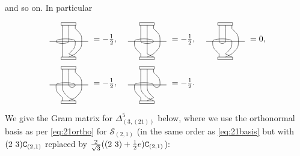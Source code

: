 \documentclass{article}
\newcommand{\ppm}[1]{\textcolor{red}{#1}}
\newcommand{\bajm}[1]{\textcolor{blue}{#1}}
\theoremstyle{definition}
\newcommand{\ignore}[1]{}
\newcommand{\onecuppppp}[6]{ %
\begin{tikzpicture}[scale=0.268]
     \draw (0,0) -- (#1,0) ;        %
     \draw (#4,0) .. controls (#4,-1) .. (2,-2);  %
     \draw (#5,0) .. controls (#5,-1) .. (3,-2);  %
     \draw (#6,0) .. controls (#6,-1) .. (4,-2);  %
\draw (2,-2) -- (2,-2.5) ; %
\draw (3,-2) -- (3,-2.5) ; %
\draw (4,-2) -- (4,-2.5) ; %
\draw (1.79,-2.5) -- (4.1,-2.5) -- (4.1,-2.92) -- (1.79,-2.92) -- (1.79,-2.5);   %
     \draw (#2,0) .. controls (#2,-.5) and (#3,-.5) .. (#3,0) ;    %
 \end{tikzpicture}
 }
\newcommand{\onecupppppx}[6]{ %
\begin{tikzpicture}[scale=0.268]
     \draw (0,0) -- (#1,0) ;        %
     \draw (#4,0) .. controls (#4,-1) .. (2,-2);  %
     \draw (#5,0) .. controls (#5,-1) .. (3,-2);  %
     \draw (#6,0) .. controls (#6,-1) .. (4,-2);  %
\draw (2,-2) -- (2,-2.5) ; %
\draw (3,-2) -- (4,-2.5) ; %
\draw (4,-2) -- (3,-2.5) ; %
\draw (1.79,-2.5) -- (4.1,-2.5) -- (4.1,-2.92) -- (1.79,-2.92) -- (1.79,-2.5);   %
     \draw (#2,0) .. controls (#2,-.5) and (#3,-.5) .. (#3,0) ;    %
 \end{tikzpicture}
 }
\newcommand{\Deltaa}{\Delta}   %
\newcommand{\Deltaaa}[2]{\Deltaa^{#1}_{#2}}
\def\SS{\mathcal{S}} %
\def\l{\lambda}
\numberwithin{equation}{subsection}
\begin{document}
\noindent 
and so on. In particular 
\ignore{{
\bajm{[I am now convinced we actually need to switch to the EFE convention for the symmetriser - this is because the explicit matrices we are writing will be wrong otherwise... for example, when $\l=(2,1)$, computing $\langle (12),e\rangle$ gives 1 in the EFE formalism since $(1 2) E=E$, yet it gives $-1$ in the FE formalism since $(12)F=-F$... For example, using $C_\l$ as written here we find  ]}
\begin{align*}&\reflectbox{\rotatebox[]{180}{\onecuppppp{6}{1}{2}{3}{4}{5}}}=C_{\l}^* (12) C_{\l}=-C_\l^* C_\l \Rightarrow \left\langle \onecuppppp{6}{1}{2}{3}{4}{5} , \onecuppppp{6}{1}{4}{2}{3}{5} \right\rangle =-1
\\[-1.7em]
&\ \onecuppppp{6}{1}{4}{2}{3}{5}\end{align*}
\bajm{[However, this should correspond to the (1,4) entry of the Gram matrix below for $\Deltaaa{{5}}{({3},(21))}$, which is 1... ]}\bajm{[I am now proceeding with the updated convention since this gives the correct matrix!]}\ppm{[agreed.  (I haven't got my head around the diff yet, but your way is not wrong.)]}
\medskip 
}}
\begin{align*}& \reflectbox{\rotatebox[]{180}{\onecuppppp{6}{1}{4}{2}{3}{5}}}=-\tfrac{1}{2},
&&\reflectbox{\rotatebox[]{180}{\onecuppppp{6}{1}{4}{2}{3}{5}}}=-\tfrac{1}{2},
&&\reflectbox{\rotatebox[]{180}{\onecuppppp{6}{1}{4}{2}{3}{5}}}=0,
\\[-0.822em]
& \ \onecupppppx{6}{1}{3}{2}{4}{5}
&&  \ \onecupppppx{6}{2}{4}{1}{3}{5}
&& \ \onecupppppx{6}{2}{3}{1}{4}{5}\\
&\reflectbox{\rotatebox[]{180}{\onecuppppp{6}{1}{4}{2}{3}{5}}}=-\tfrac{1}{2},
&&\reflectbox{\rotatebox[]{180}{\onecuppppp{6}{1}{4}{2}{3}{5}}}=-\tfrac{1}{2}.
\\[-0.822em]
& \ \onecupppppx{6}{3}{4}{1}{2}{5}
&& \ \onecupppppx{6}{4}{5}{1}{2}{3}
\end{align*}
\noindent 
We give the Gram matrix for $\Deltaaa{{5}}{({3},(21))}$ below, where we use the orthonormal basis as per \ref{eq:21ortho} for $\SS_{(2,1)}$ (in the same order as \eqref{eq:21basis} but with $(2 \ 3) {\mathtt{C}}_{(2,1)}$ replaced by $\frac{2}{\sqrt{3}}((2 \ 3)+\frac{1}{2}e ){\mathtt{C}}_{(2,1)}$): 
\end{document}
